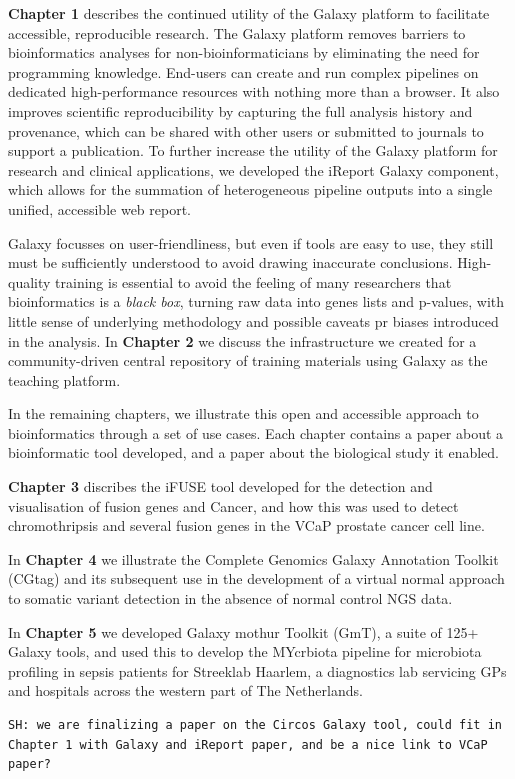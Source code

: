 \begin{justify}
\textbf{Chapter 1} describes the continued utility of the Galaxy platform to facilitate accessible, reproducible research. The Galaxy platform removes barriers to bioinformatics analyses for non-bioinformaticians by eliminating the need for programming knowledge. End-users can create and run complex pipelines on dedicated high-performance resources with nothing more than a browser. It also improves scientific reproducibility by capturing the full analysis history and provenance, which can be shared with other users or submitted to journals to support a publication. To further increase the utility of the Galaxy platform for research and clinical applications, we developed the iReport Galaxy component, which allows for the summation of heterogeneous pipeline outputs into a single unified, accessible web report.


Galaxy focusses on user-friendliness, but even if tools are easy to use, they still must be sufficiently understood to avoid drawing inaccurate conclusions. High-quality training is essential to avoid the feeling of many researchers that bioinformatics is a \emph{black box}, turning raw data into genes lists and p-values, with little sense of underlying methodology and possible caveats pr biases introduced in the analysis. In \textbf{Chapter 2} we discuss the infrastructure we created for a community-driven central repository of training materials using Galaxy as the teaching platform.



In the remaining chapters, we illustrate this open and accessible approach to bioinformatics through a set of use cases. Each chapter contains a paper about a bioinformatic tool developed, and a paper about the biological study it enabled.

\textbf{Chapter 3} discribes the iFUSE tool developed for the detection and visualisation of fusion genes and Cancer, and how this was used to detect chromothripsis and several fusion genes in the VCaP prostate cancer cell line.

In \textbf{Chapter 4} we illustrate the Complete Genomics Galaxy Annotation Toolkit (CGtag) and its subsequent use in the development of a virtual normal approach to somatic variant detection in the absence of normal control NGS data.

In \textbf{Chapter 5} we developed Galaxy mothur Toolkit (GmT), a suite of 125+ Galaxy tools, and used this to develop the MYcrbiota pipeline for microbiota profiling in sepsis patients for Streeklab Haarlem, a diagnostics lab servicing GPs and hospitals across the western part of The Netherlands.

\begin{verbatim}
SH: we are finalizing a paper on the Circos Galaxy tool, could fit in Chapter 1 with Galaxy and iReport paper, and be a nice link to VCaP paper?
\end{verbatim}

\end{justify}



